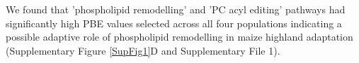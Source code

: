 \documentclass[9pt,twocolumn,twoside,lineno]{BioRxiv}
\begin{document}
We found that 'phospholipid remodelling'  and 'PC acyl editing'  pathways had significantly high PBE values selected across all four populations indicating a possible adaptive role of phospholipid remodelling in maize highland adaptation (Supplementary Figure \ref{SupFig1}D and Supplementary File 1). 
\end{document}
